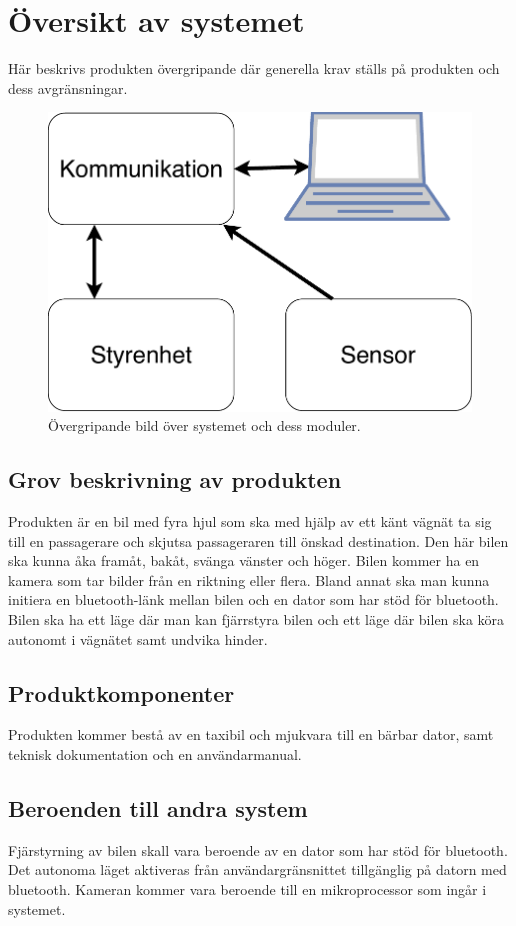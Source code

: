 \documentclass[kravspec/krav.tex]{subfiles}
\begin{document}
\section{Översikt av systemet}
Här beskrivs produkten övergripande där generella krav ställs på produkten och
dess avgränsningar.
\begin{figure}[h]
    \centering
    \includegraphics[width=0.6\linewidth]{kravspec/figures/overview-schema.pdf}
    \caption{Övergripande bild över systemet och dess moduler.}
    \label{fig:overview}
\end{figure}

\subsection{Grov beskrivning av produkten}
Produkten är en bil med fyra hjul som ska med hjälp av ett känt vägnät ta sig
till en passagerare och skjutsa passageraren till önskad destination. Den här
bilen ska kunna åka framåt, bakåt, svänga vänster och höger. Bilen kommer ha
en kamera som tar bilder från en riktning eller flera.  Bland annat ska
man kunna initiera en bluetooth-länk mellan bilen och en dator som har stöd för
bluetooth. Bilen ska ha ett läge där man kan fjärrstyra bilen och ett läge där
bilen ska köra autonomt i vägnätet samt undvika hinder.

\subsection{Produktkomponenter}
Produkten kommer bestå av en taxibil och mjukvara till en bärbar dator, samt
teknisk dokumentation och en användarmanual.

\subsection{Beroenden till andra system}
Fjärstyrning av bilen skall vara beroende av en dator som har stöd för
bluetooth. Det autonoma läget aktiveras från användargränsnittet tillgänglig på
datorn med bluetooth. Kameran kommer vara beroende till en mikroprocessor som
ingår i systemet.
\end{document}
